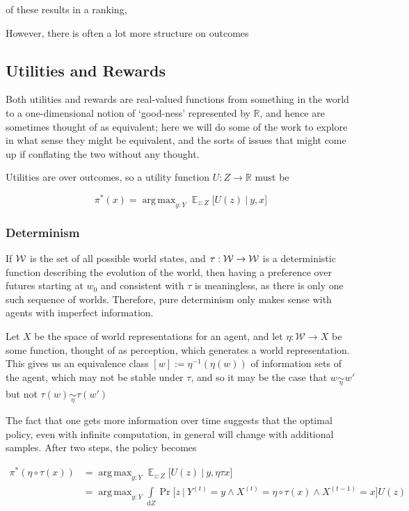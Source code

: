 \documentclass{book}
\DeclareMathOperator*{\argmax}{arg\,max}
\DeclareMathOperator*{\E}{\mathbb E}
\begin{document}
	of these results in a ranking, 
	
	However, there is often a lot more structure on outcomes
	
	
	

	
	\subsection{Utilities and Rewards}
	
	Both utilities and rewards are real-valued functions from something in the world to a one-dimensional notion of `good-ness' represented by $\mathbb R$, and hence are sometimes thought of as equivalent; here we will do some of the work to explore in what sense they might be equivalent, and the sorts of issues that might come up if conflating the two without any thought.
	
	Utilities are over outcomes, so a utility function $U : Z \to \mathbb R$ must be
	
	\[ \pi^*(x) = \argmax_{y: Y} \E_{z : Z} \Big[ U(z)~\Big|~ y,x\Big] \]
	
	\subsubsection{Determinism}
	If $\cal W$ is the set of all possible world states, and $\tau: \cal W \to W$ is a deterministic function describing the evolution of the world, then having a preference over futures starting at $w_0$ and consistent with $\tau$ is meaningless, as there is only one such sequence of worlds. Therefore, pure determinism only makes sense with agents with imperfect information. 
	
	Let $X$ be the space of world representations for an agent, and let $\eta: \mathcal W \to X$ be some function, thought of as perception, which generates a world representation. This gives us an equivalence class $[w] := \eta^{-1}(\eta(w))$ of information sets of the agent, which may not be stable under $\tau$, and so it may be the case that $w \underset\eta\sim w'$ but not $\tau(w) \underset\eta\sim \tau(w')$
	
	
	
	The fact that one gets more information over time suggests that the optimal policy, even with infinite computation, in general will change with additional samples. After two steps, the policy becomes
	
	\begin{align*}
		\pi^*(\eta\circ\tau (x)) &= \argmax_{y: Y} \E_{z : Z} \Big[ U(z)~\Big|~ y,\eta\tau x \Big]  \\
			&= \argmax_{y: Y} \int\limits_{\mathrm dZ} \Pr\Big[z~\Big|~Y^{(t)} = y \land X^{(t)}= \eta \circ \tau (x) \land X^{(t-1)} = x \Big] U(z)
	\end{align*}
		
\end{document}

